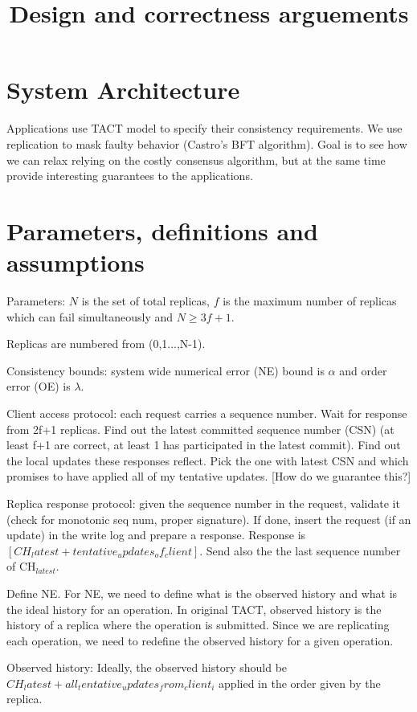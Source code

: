\documentclass[letterpaper,twocolumn,10pt]{article}
\begin{document}
\title{Design and correctness arguements}
\section{System Architecture}

Applications use TACT model to specify their consistency requirements.
We use replication to mask faulty behavior (Castro's BFT algorithm).
Goal is to see how we can relax relying on the costly consensus 
algorithm, but at the same time provide interesting guarantees to the
applications.

\section{Parameters, definitions and assumptions}

Parameters: $N$ is the set of total replicas,
$f$ is the maximum number of replicas which can fail simultaneously 
and $N \ge 3f+1$.

Replicas are numbered from (0,1...,N-1).

Consistency bounds: system wide numerical error (NE)
bound is $\alpha$ and order error (OE) is $\lambda$.

Client access protocol: each request carries a sequence number.
Wait for response from 2f+1 replicas. Find out the latest committed
sequence number (CSN) (at least f+1 are correct, at least 1 has participated
in the latest commit). Find out the local updates these responses 
reflect. Pick the one with latest CSN and which promises to have
applied all of my tentative updates. [How do we guarantee this?]

Replica response protocol: given the sequence number in the request,
validate it (check for monotonic seq num, proper signature). If done,
insert the request (if an update) in the write log and prepare a response.
Response is $[CH_latest + tentative_updates_of_client]$. Send also the
the last sequence number of CH$_{latest}$.

Define NE. For NE, we need to define what is the observed history
and what is the ideal history for an operation. In original TACT,
observed history is the history of a replica where the operation is
submitted. Since we are replicating each operation, we need to redefine
the observed history for a given operation.

Observed history: Ideally, the observed history should be
$CH_latest + all_tentative_updates_from_client_i$ applied in the
order given by the replica.
\end{document}

